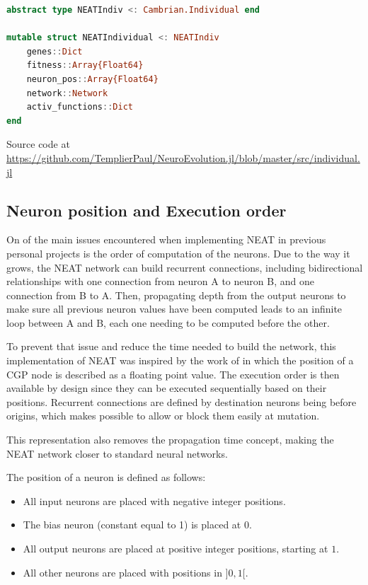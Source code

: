 \begin{minipage}{\linewidth}
\begin{lstlisting}[language=Julia, caption=NEAT Individual]
abstract type NEATIndiv <: Cambrian.Individual end

mutable struct NEATIndividual <: NEATIndiv
    genes::Dict
    fitness::Array{Float64}
    neuron_pos::Array{Float64}
    network::Network
    activ_functions::Dict
end
\end{lstlisting}
Source code at \url{https://github.com/TemplierPaul/NeuroEvolution.jl/blob/master/src/individual.jl}\\
\end{minipage}


\subsection{Neuron position and Execution order}
\label{subsec:NEAT_neur_pos}

On of the main issues encountered when implementing NEAT in previous personal projects is the order of computation of the neurons. Due to the way it grows, the NEAT network can build recurrent connections, including bidirectional relationships with one connection from neuron A to neuron B, and one connection from B to A. Then, propagating depth from the output neurons to make sure all previous neuron values have been computed leads to an infinite loop between A and B, each one needing to be computed before the other. 

To prevent that issue and reduce the time needed to build the network, this implementation of NEAT was inspired by the work of \cite{wilson2018positionalcgp} in which the position of a CGP node is described as a floating point value. The execution order is then available by design since they can be executed sequentially based on their positions. Recurrent connections are defined by destination neurons being before origins, which makes possible to allow or block them easily at mutation. 

This representation also removes the propagation time concept, making the NEAT network closer to standard neural networks. 

The position of a neuron is defined as follows:
\begin{itemize}
    \item All input neurons are placed with negative integer positions.  
    \item The bias neuron (constant equal to 1) is placed at $0$.  
    \item All output neurons are placed at positive integer positions, starting at $1$.
    \item All other neurons are placed with positions in $]0, 1[$.
\end{itemize}

